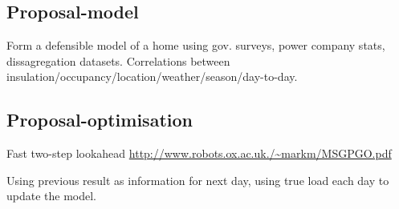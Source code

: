 \documentclass[a4paper, 10 pt, conference]{ieeeconf}  %
\begin{document}
\subsection{Proposal-model}
Form a defensible model of a home using gov. surveys, power company stats, dissagregation datasets. Correlations between insulation/occupancy/location/weather/season/day-to-day.
\subsection{Proposal-optimisation}
Fast two-step lookahead \url{http://www.robots.ox.ac.uk./~markm/MSGPGO.pdf}

Using previous result as information for next day, using true load each day to update the model.

{}

\end{document}
